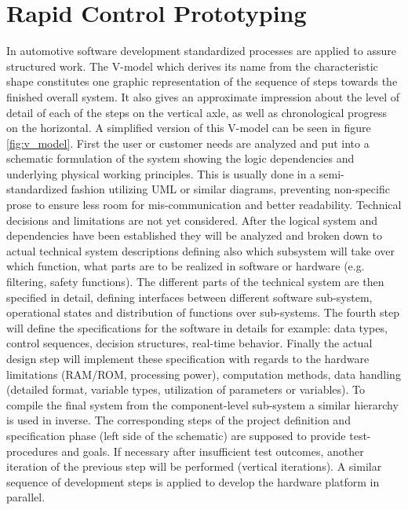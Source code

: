 \documentclass[ExampleMasters.tex]{subfiles}
\begin{document}
\section{Rapid Control Prototyping}
\label{sec:rapid_proto}

In automotive software development standardized processes are applied to assure structured work. The V-model which derives its name from the characteristic shape constitutes one graphic representation of the sequence of steps towards the finished overall system. It also gives an approximate impression about the level of detail of each of the steps on the vertical axle, as well as chronological progress on the horizontal. A simplified version of this V-model can be seen in figure \ref{fig:v_model}. First the user or customer needs are analyzed and put into a schematic formulation of the system showing the logic dependencies and underlying physical working principles. This is usually done in a semi-standardized fashion utilizing \gls{UML} or similar diagrams, preventing non-specific prose to ensure less room for mis-communication and better readability. Technical decisions and limitations are not yet considered. After the logical system and dependencies have been established they will be analyzed and broken down to actual technical system descriptions defining also which subsystem will take over which function, what parts are to be realized in software or hardware (e.g. filtering, safety functions). The different parts of the technical system are then specified in detail, defining interfaces between different software sub-system, operational states and distribution of functions over sub-systems. The fourth step will define the specifications for the software in details for example: data types, control sequences, decision structures, real-time behavior. Finally the actual design step will implement these specification with regards to the hardware limitations (RAM/ROM, processing power), computation methods, data handling (detailed format, variable types, utilization of parameters or variables). To compile the final system from the component-level sub-system a similar hierarchy is used in inverse. The corresponding steps of the project definition and specification phase (left side of the schematic) are supposed to provide test-procedures and goals. If necessary after insufficient test outcomes, another iteration of the previous step will be performed (vertical iterations). A similar sequence of development steps is applied to develop the hardware platform in parallel\cite{automotive_software_engineering}.
\end{document}
